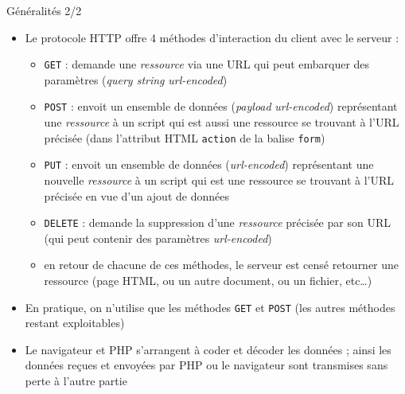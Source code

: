 \begin{frame}[containsverbatim]{Généralités 2/2}
	\begin{itemize}
		\item Le protocole HTTP offre 4 méthodes d’interaction du client avec le serveur :
		\begin{itemize}
			\item \texttt{GET} : demande une \emph{ressource} via une URL qui peut embarquer des paramètres (\textit{query string} \textit{url-encoded})
			\item \texttt{POST} : envoit un ensemble de données (\textit{payload} \textit{url-encoded}) représentant une \emph{ressource} à un script qui est aussi une ressource se trouvant à l’URL précisée (dans l’attribut HTML \texttt{action} de la balise \texttt{form})
			\item \texttt{PUT} : envoit un ensemble de données (\textit{url-encoded}) représentant une nouvelle \emph{ressource} à un script qui est une ressource se trouvant à l’URL précisée en vue d’un ajout de données
			\item \texttt{DELETE} : demande la suppression d’une \emph{ressource} précisée par son URL (qui peut contenir des paramètres \textit{url-encoded})
			\item en retour de chacune de ces méthodes, le serveur est censé retourner une ressource (page HTML, ou un autre document, ou un fichier, etc\ldots)
		\end{itemize}
		\item En pratique, on n’utilise que les méthodes \texttt{GET} et \texttt{POST} (les autres méthodes restant exploitables)
		\item Le navigateur et PHP s’arrangent à coder et décoder les données ; ainsi les données reçues et envoyées par PHP ou le navigateur sont transmises sans perte à l’autre partie
	\end{itemize}
\end{frame}

